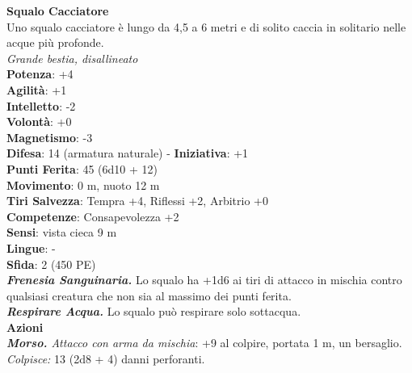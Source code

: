 \begin{multicols}{2}
\medskip\textbf{Squalo Cacciatore}\\
Uno squalo cacciatore è lungo da 4,5 a 6 metri e di solito caccia in solitario nelle acque più profonde.\\
\emph{Grande bestia, disallineato}\\
\textbf{Potenza}: +4\\
\textbf{Agilità}: +1\\
\textbf{Intelletto}: -2\\
\textbf{Volontà}: +0\\
\textbf{Magnetismo}: -3\\
\textbf{Difesa}: 14 (armatura naturale) - \textbf{Iniziativa}: +1\\
\textbf{Punti Ferita}: 45 (6d10 + 12)\\
\textbf{Movimento}: 0 m, nuoto 12 m\\
\textbf{Tiri Salvezza}: Tempra +4, Riflessi +2, Arbitrio +0\\
\textbf{Competenze}: Consapevolezza +2\\
\textbf{Sensi}: vista cieca 9 m\\
\textbf{Lingue}: -\\
\textbf{Sfida}: 2 (450 PE)\smallskip\\
\emph{\textbf{Frenesia Sanguinaria.}} Lo squalo ha +1d6 ai tiri di attacco in mischia contro qualsiasi creatura che non sia al massimo dei punti ferita.\\
\emph{\textbf{Respirare Acqua.}} Lo squalo può respirare solo sottacqua.\\
\smallskip\textbf{Azioni}\\
\emph{\textbf{Morso.} Attacco con arma da mischia}: +9 al colpire, portata 1 m, un bersaglio.\\
\emph{Colpisce:} 13 (2d8 + 4) danni perforanti.\\


\end{multicols}
